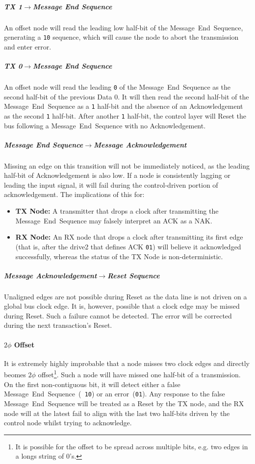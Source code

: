 \subparagraph{TX 1$\rightarrow$Message End Sequence}
An offset node will read the leading low half-bit of the
Message~End~Sequence, generating a {\tt 10} sequence, which will cause the
node to abort the transmission and enter {\sc error}.

\subparagraph{TX 0$\rightarrow$Message End Sequence}
An offset node will read the leading {\tt 0} of the Message~End~Sequence as
the second half-bit of the previous Data 0. It will then read the second
half-bit of the Message~End~Sequence as a {\tt 1} half-bit and the absence of
an Acknowledgement as the second {\tt 1} half-bit. After another {\tt 1}
half-bit, the control layer will Reset the bus following a
Message~End~Sequence with no Acknowledgement.

\subparagraph{Message End Sequence$\rightarrow$Message Acknowledgement}
Missing an edge on this transition will not be immediately noticed, as the
leading half-bit of Acknowledgement is also low. If a node is consistently
lagging or leading the input signal, it will fail during the control-driven
portion of acknowledgement. The implications of this for:

\begin{itemize}
  \item {\bf TX Node:} A transmitter that drops a clock after transmitting the
Message~End~Sequence may falsely interpret an ACK as a NAK.

  \item {\bf RX Node:} An RX node that drops a clock after transmitting its
first edge (that is, after the {\sc drive2} that defines ACK {\tt 01}) will
believe it acknowledged successfully, whereas the status of the TX Node is
non-deterministic.
\end{itemize}

\subparagraph{Message Acknowledgement$\rightarrow$Reset Sequence}
Unaligned edges are not possible during Reset as the data line is not driven
on a global bus clock edge. It is, however, possible that a clock edge may be
missed during Reset. Such a failure cannot be detected. The error will be
corrected during the next transaction's Reset.


\paragraph{$2\phi$ Offset}
It is extremely highly improbable that a node misses two clock edges and
directly beomes $2\phi$ offset\footnote{
  It is possible for the offset to be spread across multiple bits, e.g.
  two edges in a longs string of 0's.}.
Such a node will have missed one half-bit of a transmission. On the first
non-contiguous bit, it will detect either a false Message~End~Sequence~({\tt
10}) or an error~({\tt 01}). Any response to the false Message~End~Sequence
will be treated as a Reset by the TX node, and the RX node will at the latest
fail to align with the last two half-bits driven by the control node whilst
trying to acknowledge.


